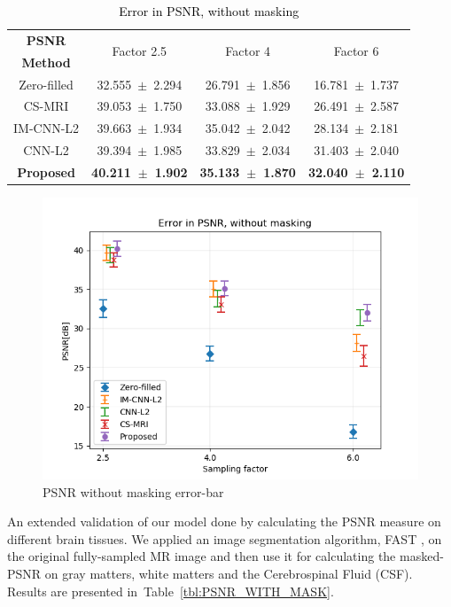 \documentclass[review]{elsarticle}
\begin{document}
\begin{table}[H]
	\centering{}
	\begin{tabular}{|c||c||c||c|}
		\hline 
		\textbf{PSNR} & \multicolumn{1}{c||}{\multirow{2}{*}{Factor 2.5}} & \multicolumn{1}{c||}{\multirow{2}{*}{Factor 4}} & \multicolumn{1}{c|}{\multirow{2}{*}{Factor 6}} \tabularnewline
		\textbf{Method} & \multicolumn{1}{c||}{} & \multicolumn{1}{c||}{} & \multicolumn{1}{c|}{} \tabularnewline \cline{1-4}
		
		Zero-filled         &32.555~$\pm$~2.294  &26.791~$\pm$~1.856 &16.781~$\pm$~1.737\tabularnewline
		CS-MRI              &39.053~$\pm$~1.750  &33.088~$\pm$~1.929 &26.491~$\pm$~2.587\tabularnewline
		IM-CNN-L2           &39.663~$\pm$~1.934  &35.042~$\pm$~2.042 &28.134~$\pm$~2.181\tabularnewline
		CNN-L2              &39.394~$\pm$~1.985  &33.829~$\pm$~2.034 &31.403~$\pm$~2.040\tabularnewline
		\textbf{Proposed}   &\textbf{40.211~$\pm$~1.902}  &\textbf{35.133~$\pm$~1.870}   &\textbf{32.040~$\pm$~2.110}\tabularnewline
		\hline 
	\end{tabular}\caption{\textcolor{black}{\footnotesize{}{}Error in PSNR, without masking}{\footnotesize{}\label{tbl:PSNR_NO_MASK}}}
\end{table}



\begin{figure}[H]
\centering
\includegraphics[width=0.7\linewidth]{include/grp2/error_psnr_errorbar}
\caption{PSNR without masking error-bar}
\end{figure}\label{fig:error_psnr_errorbar}

An extended validation of our model done by calculating the PSNR measure on different brain tissues. We applied an image segmentation algorithm, FAST \cite{zhang2001segmentation}, on the original fully-sampled MR image and then use it for calculating the masked-PSNR on gray matters, white matters and the Cerebrospinal Fluid (CSF). Results are presented in~Table~\ref{tbl:PSNR_WITH_MASK}.
\end{document}
